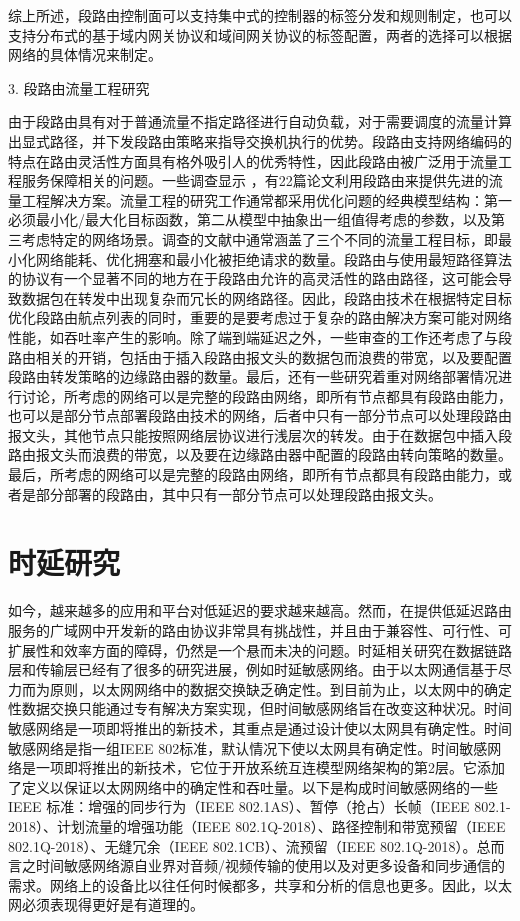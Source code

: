 综上所述，段路由控制面可以支持集中式的控制器的标签分发和规则制定，也可以支持分布式的基于域内网关协议和域间网关协议的标签配置，两者的选择可以根据网络的具体情况来制定。

3. 段路由流量工程研究

由于段路由具有对于普通流量不指定路径进行自动负载，对于需要调度的流量计算出显式路径，并下发段路由策略来指导交换机执行的优势。段路由支持网络编码的特点在路由灵活性方面具有格外吸引人的优秀特性，因此段路由被广泛用于流量工程服务保障相关的问题。一些调查显示 \cite{SRSURVEYS} ，有22篇论文利用段路由来提供先进的流量工程解决方案。流量工程的研究工作通常都采用优化问题的经典模型结构：第一必须最小化/最大化目标函数，第二从模型中抽象出一组值得考虑的参数，以及第三考虑特定的网络场景。调查的文献中通常涵盖了三个不同的流量工程目标，即最小化网络能耗、优化拥塞和最小化被拒绝请求的数量。段路由与使用最短路径算法的协议有一个显著不同的地方在于段路由允许的高灵活性的路由路径，这可能会导致数据包在转发中出现复杂而冗长的网络路径。因此，段路由技术在根据特定目标优化段路由航点列表的同时，重要的是要考虑过于复杂的路由解决方案可能对网络性能，如吞吐率产生的影响。除了端到端延迟之外，一些审查的工作还考虑了与段路由相关的开销，包括由于插入段路由报文头的数据包而浪费的带宽，以及要配置段路由转发策略的边缘路由器的数量。最后，还有一些研究着重对网络部署情况进行讨论，所考虑的网络可以是完整的段路由网络，即所有节点都具有段路由能力，也可以是部分节点部署段路由技术的网络，后者中只有一部分节点可以处理段路由报文头，其他节点只能按照网络层协议进行浅层次的转发。由于在数据包中插入段路由报文头而浪费的带宽，以及要在边缘路由器中配置的段路由转向策略的数量。最后，所考虑的网络可以是完整的段路由网络，即所有节点都具有段路由能力，或者是部分部署的段路由，其中只有一部分节点可以处理段路由报文头。

\section{时延研究}

如今，越来越多的应用和平台对低延迟的要求越来越高。然而，在提供低延迟路由服务的广域网中开发新的路由协议非常具有挑战性，并且由于兼容性、可行性、可扩展性和效率方面的障碍，仍然是一个悬而未决的问题。时延相关研究在数据链路层和传输层已经有了很多的研究进展，例如时延敏感网络。由于以太网通信基于尽力而为原则，以太网网络中的数据交换缺乏确定性。到目前为止，以太网中的确定性数据交换只能通过专有解决方案实现，但时间敏感网络旨在改变这种状况。时间敏感网络是一项即将推出的新技术，其重点是通过设计使以太网具有确定性。时间敏感网络是指一组IEEE 802标准，默认情况下使以太网具有确定性。时间敏感网络是一项即将推出的新技术，它位于开放系统互连模型网络架构的第2层。它添加了定义以保证以太网网络中的确定性和吞吐量。以下是构成时间敏感网络的一些 IEEE 标准：增强的同步行为（IEEE 802.1AS）、暂停（抢占）长帧（IEEE 802.1-2018）、计划流量的增强功能（IEEE 802.1Q-2018）、路径控制和带宽预留（IEEE 802.1Q-2018）、无缝冗余（IEEE 802.1CB）、流预留（IEEE 802.1Q-2018）。总而言之时间敏感网络源自业界对音频/视频传输的使用以及对更多设备和同步通信的需求。网络上的设备比以往任何时候都多，共享和分析的信息也更多。因此，以太网必须表现得更好是有道理的。

